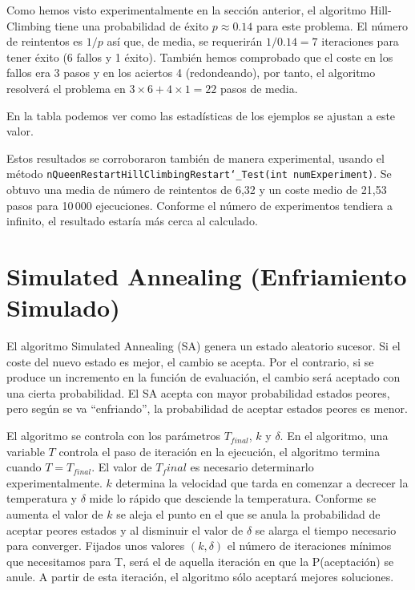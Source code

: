 \documentclass[..main.tex]{subfiles}
\begin{document}
Como hemos visto experimentalmente en la sección anterior, el algoritmo Hill-Climbing tiene una probabilidad de éxito $p \approx 0.14$ para este problema. El número de reintentos es $1/p$ así que, de media, se requerirán $1/0.14=7$ iteraciones para tener éxito (6 fallos y 1 éxito). También hemos comprobado que el coste en los fallos era 3 pasos y en los aciertos 4 (redondeando), por tanto, el algoritmo resolverá el problema en $3\times 6 + 4\times 1 = 22$ pasos de media. %

En la tabla podemos ver como las estadísticas de los ejemplos se ajustan a este valor.

Estos resultados se corroboraron también de manera experimental, usando el método \texttt{nQueenRestartHillClimbingRestart\char`_Test(int numExperiment)}. Se obtuvo una media de número de reintentos de 6,32 y un coste medio de 21,53 pasos para 10\,000 ejecuciones. Conforme el número de experimentos tendiera a infinito, el resultado estaría más cerca al calculado.


\section{Simulated Annealing (Enfriamiento Simulado)}
El algoritmo Simulated Annealing (SA) genera un estado aleatorio sucesor. Si el coste del nuevo estado es mejor, el cambio se acepta. Por el contrario, si se produce un incremento en la función de evaluación, el cambio será aceptado con una cierta probabilidad. El SA acepta con mayor probabilidad estados peores, pero según se va ``enfriando'', la probabilidad de aceptar estados peores es menor.

El algoritmo se controla con los parámetros $T_{final}$, $k$ y $\delta$. En el algoritmo, una variable $T$ controla el paso de iteración en la ejecución, el algoritmo termina cuando $T = T_{final}$. El valor de $T_final$ es necesario determinarlo experimentalmente. $k$ determina la velocidad que tarda en comenzar a decrecer la temperatura y $\delta$ mide lo rápido que desciende la temperatura. Conforme se aumenta el valor de $k$ se aleja el punto en el que se anula la probabilidad de aceptar peores estados y al disminuir el valor de $\delta$ se alarga el tiempo necesario para converger. Fijados unos valores $(k, \delta)$ el número de iteraciones mínimos que necesitamos para T, será el de aquella iteración en que la P(aceptación) se anule. A partir de esta iteración, el algoritmo sólo aceptará mejores soluciones.
\end{document}
